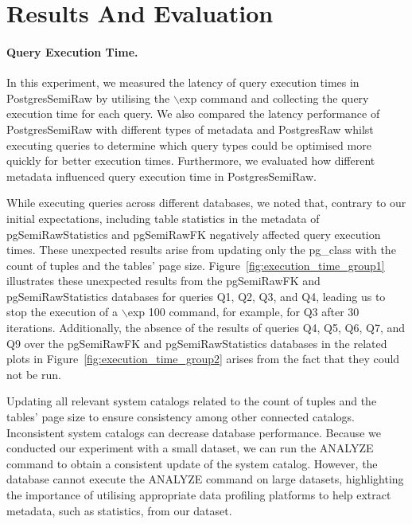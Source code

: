 \section{Results And Evaluation}
\label{sec:result-eval}

\paragraph{Query Execution Time.}
In this experiment, we measured the latency of query execution times in PostgresSemiRaw by utilising the $\backslash$exp command and collecting the query execution time for each query. We also compared the latency performance of PostgresSemiRaw with different types of metadata and PostgresRaw whilst executing queries to determine which query types could be optimised more quickly for better execution times. Furthermore, we evaluated how different metadata influenced query execution time in PostgresSemiRaw.

While executing queries across different databases, we noted that, contrary to our initial expectations, including table statistics in the metadata of pgSemiRawStatistics and pgSemiRawFK negatively affected query execution times. These unexpected results arise from updating only the pg\_class with the count of tuples and the tables' page size. Figure~\ref{fig:execution_time_group1} illustrates these unexpected results from the pgSemiRawFK and pgSemiRawStatistics databases for queries Q1, Q2, Q3, and Q4, leading us to stop the execution of a $\backslash$exp 100 command, for example, for Q3 after 30 iterations. Additionally, the absence of the results of queries Q4, Q5, Q6, Q7, and Q9 over the pgSemiRawFK and pgSemiRawStatistics databases in the related plots in Figure~\ref{fig:execution_time_group2} arises from the fact that they could not be run. 



Updating all relevant system catalogs related to the count of tuples and the tables' page size to ensure consistency among other connected catalogs. Inconsistent system catalogs can decrease database performance. Because we conducted our experiment with a small dataset, we can run the ANALYZE command to obtain a consistent update of the system catalog. However, the database cannot execute the ANALYZE command on large datasets, highlighting the importance of utilising appropriate data profiling platforms to help extract metadata, such as statistics, from our dataset.

